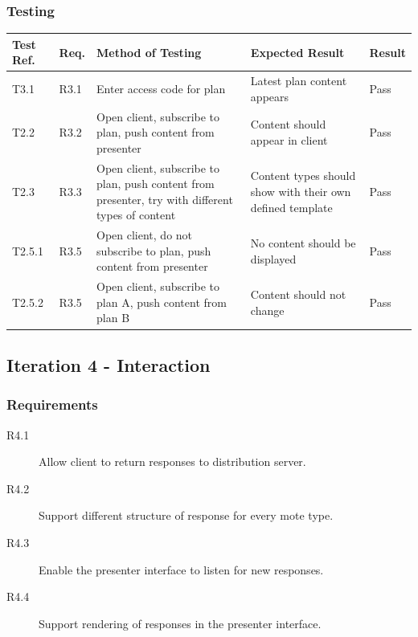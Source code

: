 \documentclass[a4papert,11pt,notitlepage]{article}
\begin{document}
\begin{appendices}
\subsubsection{Testing}
\begin{tabular}{p{30pt} | p{25pt} | p{140pt} | p{140pt} || p{90pt}}
Test Ref. & Req. & Method of Testing & Expected Result & Result \\ \hline
T3.1 & R3.1 & Enter access code for plan & Latest plan content appears & Pass \\
T2.2 & R3.2 & Open client, subscribe to plan, push content from presenter & Content should appear in client & Pass \\
T2.3 & R3.3 & Open client, subscribe to plan, push content from presenter, try with different types of content & Content types should show with their own defined template & Pass \\
T2.5.1 & R3.5 & Open client, do not subscribe to plan, push content from presenter & No content should be displayed & Pass \\
T2.5.2 & R3.5 & Open client, subscribe to plan A, push content from plan B & Content should not change & Pass \\
\end{tabular}

\subsection{Iteration 4 - Interaction}
\subsubsection{Requirements}
\begin{description}
\item[R4.1] Allow client to return responses to distribution server.
\item[R4.2] Support different structure of response for every mote type.
\item[R4.3] Enable the presenter interface to listen for new responses.
\item[R4.4] Support rendering of responses in the presenter interface.
\end{description}


\end{appendices}
\end{document}
